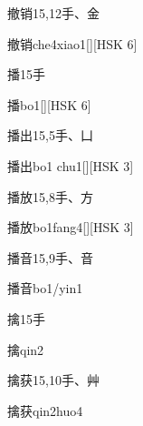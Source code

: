 \begin{Entry}{撤销}{15,12}{⼿、⾦}
  \begin{Phonetics}{撤销}{che4xiao1}[][HSK 6]
  \end{Phonetics}
\end{Entry}

\begin{Entry}{播}{15}{⼿}
  \begin{Phonetics}{播}{bo1}[][HSK 6]
  \end{Phonetics}
\end{Entry}

\begin{Entry}{播出}{15,5}{⼿、⼐}
  \begin{Phonetics}{播出}{bo1 chu1}[][HSK 3]
  \end{Phonetics}
\end{Entry}

\begin{Entry}{播放}{15,8}{⼿、⽅}
  \begin{Phonetics}{播放}{bo1fang4}[][HSK 3]
  \end{Phonetics}
\end{Entry}

\begin{Entry}{播音}{15,9}{⼿、⾳}
  \begin{Phonetics}{播音}{bo1/yin1}
  \end{Phonetics}
\end{Entry}

\begin{Entry}{擒}{15}{⼿}
  \begin{Phonetics}{擒}{qin2}
  \end{Phonetics}
\end{Entry}

\begin{Entry}{擒获}{15,10}{⼿、⾋}
  \begin{Phonetics}{擒获}{qin2huo4}
  \end{Phonetics}
\end{Entry}

